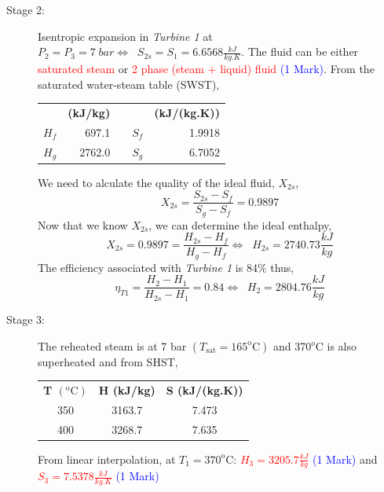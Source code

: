 \documentclass[12pt,twoside]{report}
\newcommand{\frc}{\displaystyle\frac}
\begin{document}
\begin{description}
\begin{enumerate}[(a)]
\begin{description}
\item [Stage 2:] Isentropic expansion in {\it Turbine 1} at $P_{2}=P_{3}=7\; bar \Leftrightarrow \;\; S_{2s}=S_{1}=6.6568\frc{kJ}{kg.K}$.  The fluid can be either \textcolor{red}{saturated steam} or \textcolor{red}{2 phase (steam + liquid) fluid} \textcolor{blue}{(1 Mark)}. From the saturated water-steam table (SWST),
\begin{center}
\begin{tabular}{l r c l r}
         & {\bf (kJ/kg)}  &  &          & {\bf (kJ/(kg.K))} \\
$H_{f}$   & 697.1          &  & $S_{f}$  & 1.9918 \\
$H_{g}$   & 2762.0        &   & $S_{g}$  & 6.7052  \\
\end{tabular}
\end{center}
We need to alculate the quality of the ideal fluid, $X_{2s}$,
\begin{displaymath}
X_{2s} = \frc{S_{2s}-S_{f}}{S_{g}-S_{f}} = 0.9897
\end{displaymath}
Now that we know $X_{2s}$, we can determine the ideal enthalpy,
\begin{displaymath}
X_{2s}=0.9897=\frc{H_{2s}-H_{f}}{H_{g}-H_{f}} \Leftrightarrow \;\;  H_{2s} = 2740.73 \frc{kJ}{kg}
\end{displaymath}
The efficiency associated with {\it Turbine 1} is 84$\%$ thus,
\begin{displaymath}
\eta_{T1} = \frc{H_{2}-H_{1}}{H_{2s}-H_{1}} = 0.84 \Leftrightarrow \;\;  H_{2}=2804.76 \frc{kJ}{kg}
\end{displaymath}

\item [Stage 3:] The reheated steam is at 7 bar $\left(T_{\text{sat}}=165^{\text{o}}\text{C}\right)$ and 370$^{o}$C is also superheated and from SHST,
\begin{center}
\begin{tabular}{c c c}
{\bf T $\left(^{\text{o}}\text{C}\right)$} & {\bf H (kJ/kg)}  & {\bf S (kJ/(kg.K))} \\ 
350                                      & 3163.7           & 7.473      \\
400                                      & 3268.7           & 7.635      \\
\end{tabular}
\end{center}
From linear interpolation, at $T_{1}=370^{\text{o}}\text{C}$: \textcolor{red}{$H_{3}=3205.7\frc{kJ}{kg}$} \textcolor{blue}{(1 Mark)} and \textcolor{red}{$S_{3}=7.5378\frc{kJ}{kg.K}$} \textcolor{blue}{(1 Mark)}



\end{description}
\end{enumerate}
\end{description}
\end{document}
